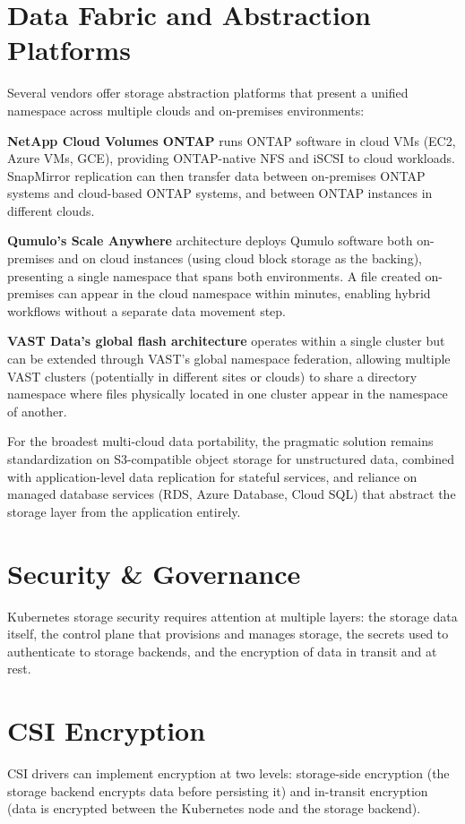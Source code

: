 \section{Data Fabric and Abstraction Platforms}
Several vendors offer storage abstraction platforms that present a unified namespace across multiple clouds and on-premises environments:

\textbf{NetApp Cloud Volumes ONTAP} runs ONTAP software in cloud VMs (EC2, Azure VMs, GCE), providing ONTAP-native NFS and iSCSI to cloud workloads. SnapMirror replication can then transfer data between on-premises ONTAP systems and cloud-based ONTAP systems, and between ONTAP instances in different clouds.

\textbf{Qumulo's Scale Anywhere} architecture deploys Qumulo software both on-premises and on cloud instances (using cloud block storage as the backing), presenting a single namespace that spans both environments. A file created on-premises can appear in the cloud namespace within minutes, enabling hybrid workflows without a separate data movement step.

\textbf{VAST Data's global flash architecture} operates within a single cluster but can be extended through VAST's global namespace federation, allowing multiple VAST clusters (potentially in different sites or clouds) to share a directory namespace where files physically located in one cluster appear in the namespace of another.

For the broadest multi-cloud data portability, the pragmatic solution remains standardization on S3-compatible object storage for unstructured data, combined with application-level data replication for stateful services, and reliance on managed database services (RDS, Azure Database, Cloud SQL) that abstract the storage layer from the application entirely.

\section{Security \& Governance}
Kubernetes storage security requires attention at multiple layers: the storage data itself, the control plane that provisions and manages storage, the secrets used to authenticate to storage backends, and the encryption of data in transit and at rest.

\section{CSI Encryption}
CSI drivers can implement encryption at two levels: storage-side encryption (the storage backend encrypts data before persisting it) and in-transit encryption (data is encrypted between the Kubernetes node and the storage backend).

